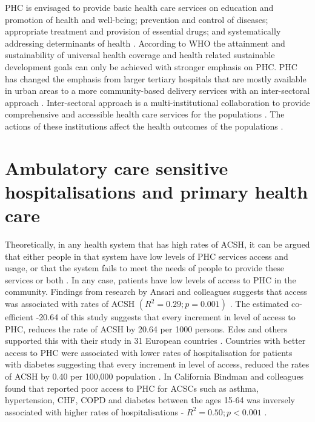 PHC is envisaged to provide basic health care services on education and promotion of health and well-being; prevention and control of diseases; appropriate treatment and provision of essential drugs; and systematically addressing determinants of health \cite{vision:PHC:21century}. According to WHO \cite{vision:PHC:21century} the attainment and sustainability of universal health coverage and health related sustainable development goals can only be achieved with stronger emphasis on PHC. PHC has changed the emphasis from larger tertiary hospitals that are mostly available in urban areas to a more community-based delivery services with an inter-sectoral approach  \cite{to2003health}. Inter-sectoral approach is a multi-institutional collaboration to provide comprehensive and accessible health care services for the populations \cite{Inter:sectoral:action}. The actions of these institutions affect the health outcomes of the populations \cite{Inter:sectoral:action}. 

\section{Ambulatory care sensitive hospitalisations and primary health care}

Theoretically, in any health system that has high rates of ACSH, it can be argued that either people in that system have low levels of PHC services access and usage, or that the system fails to meet the needs of people to provide these services or both \cite{ansari2012patient,ansari2006access,laditka2003hospital,bindman1995preventable,billings1993impact,millman1993access}. In any case, patients have low levels of access to PHC in the community. Findings from research by Ansari and colleagues suggests that access was associated with rates of ACSH $(R^2=0.29;p=0.001)$ \cite{ansari2006access}. The estimated co-efficient -20.64 of this study suggests that every increment in level of access to PHC, reduces the rate of ACSH by 20.64 per 1000 persons. Edes and others supported this with their study in 31 European countries \cite{edes2014better}. Countries with better access to PHC were associated with lower rates of hospitalisation for patients with diabetes suggesting that every increment in level of access, reduced the rates of ACSH by 0.40 per 100,000 population \cite{edes2014better}. In California Bindman and colleagues found that reported poor access to PHC for ACSCs such as asthma, hypertension, CHF, COPD and diabetes between the ages 15-64 was inversely associated with higher rates of hospitalisations - $R^2=0.50;p<0.001$ \cite{bindman1995preventable}.

